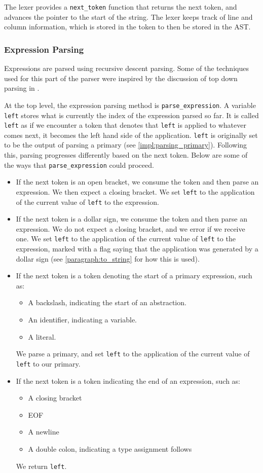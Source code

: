 The lexer provides a \verb|next_token| function that returns the next token, and advances the pointer to the start of the string. The lexer keeps track of line and column information, which is stored in the token to then be stored in the AST. 

\subsubsection{Expression Parsing}
Expressions are parsed using recursive descent parsing. Some of the techniques used for this part of the parser were inspired by the discussion of top down parsing in \cite{dragon_book}. 

At the top level, the expression parsing method is \verb|parse_expression|. A variable \verb|left| stores what is currently the index of the expression parsed so far. It is called \verb|left| as if we encounter a token that denotes that \verb|left| is applied to whatever comes next, it becomes the left hand side of the application. \verb|left| is originally set to be the output of parsing a primary (see \ref{impl:parsing_primary}). Following this, parsing progresses differently based on the next token. Below are some of the ways that \verb|parse_expression| could proceed.
\begin{itemize}
    \item If the next token is an open bracket, we consume the token and then parse an expression. We then expect a closing bracket. We set \verb|left| to the application of the current value of \verb|left| to the expression.
    \item If the next token is a dollar sign, we consume the token and then parse an expression. We do not expect a closing bracket, and we error if we receive one.  We set \verb|left| to the application of the current value of \verb|left| to the expression, marked with a flag saying that the application was generated by a dollar sign (see \ref{paragraph:to_string} for how this is used).
    \item If the next token is a token denoting the start of a primary expression, such as:
    \begin{itemize}
        \item A backslash, indicating the start of an abstraction.
        \item An identifier, indicating a variable.
        \item A literal.
    \end{itemize}
    We parse a primary, and set \verb|left| to the application of the current value of \verb|left| to our primary.
    \item If the next token is a token indicating the end of an expression, such as:
    \begin{itemize}
        \item A closing bracket
        \item EOF
        \item A newline
        \item A double colon, indicating a type assignment follows
    \end{itemize}
    We return \verb|left|. 
\end{itemize}

